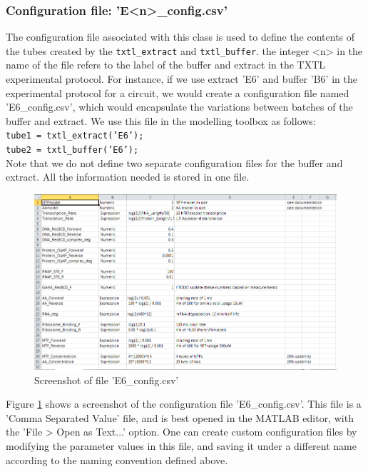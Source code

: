 \documentclass[english]{report}
\begin{document}
		\subsubsection*{Configuration file: \textsf{'E<n>\_config.csv'}}
		The configuration file associated with this class is used to define the contents of the tubes created by the \texttt{txtl\_extract} and \texttt{txtl\_buffer}. the integer <n> in the name of the file refers to the label of the buffer and extract in the TXTL experimental protocol. For instance, if we use extract \textsf{'E6'} and buffer \textsf{'B6'} in the experimental protocol for a circuit, we would create a configuration file named \textsf{'E6\_config.csv'}, which would encapsulate the variations between batches of the buffer and extract.  We use this file in the modelling toolbox as follows: \\
		
		\noindent \texttt{tube1 = txtl\_extract('E6');} \\
		\texttt{tube2 = txtl\_buffer('E6');} \\
		
Note that we do not define two separate configuration files for the buffer and extract. All the information needed is stored in one file. \\

		\begin{figure}
		\begin{center}
		\includegraphics[width=\textwidth]{Config_E6_screenshot.png} 
		\caption{Screenshot of file 'E6\_config.csv'}
		\label{fig:reactionconfig}
		\end{center}
		\end{figure}

Figure \ref{fig:reactionconfig} shows a screenshot of the configuration file \textsf{'E6\_config.csv'}. This file is a 'Comma Separated Value' file, and is best opened in the MATLAB editor, with the 'File > Open as Text...' option. One can create custom configuration files by modifying the parameter values in this file, and saving it under a different name according to the naming convention defined above. 
\end{document}
